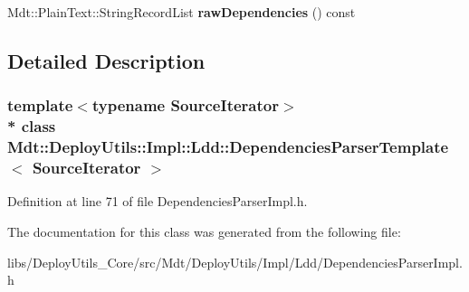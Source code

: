\begin{DoxyCompactItemize}
\item 
Mdt\+::\+Plain\+Text\+::\+String\+Record\+List {\bfseries raw\+Dependencies} () const \hypertarget{class_mdt_1_1_deploy_utils_1_1_impl_1_1_ldd_1_1_dependencies_parser_template_ac6df5d3af75e154de5437c5b1e20a368}{}\label{class_mdt_1_1_deploy_utils_1_1_impl_1_1_ldd_1_1_dependencies_parser_template_ac6df5d3af75e154de5437c5b1e20a368}

\end{DoxyCompactItemize}


\subsection{Detailed Description}
\subsubsection*{template$<$typename Source\+Iterator$>$\\*
class Mdt\+::\+Deploy\+Utils\+::\+Impl\+::\+Ldd\+::\+Dependencies\+Parser\+Template$<$ Source\+Iterator $>$}



Definition at line 71 of file Dependencies\+Parser\+Impl.\+h.



The documentation for this class was generated from the following file\+:\begin{DoxyCompactItemize}
\item 
libs/\+Deploy\+Utils\+\_\+\+Core/src/\+Mdt/\+Deploy\+Utils/\+Impl/\+Ldd/Dependencies\+Parser\+Impl.\+h\end{DoxyCompactItemize}
